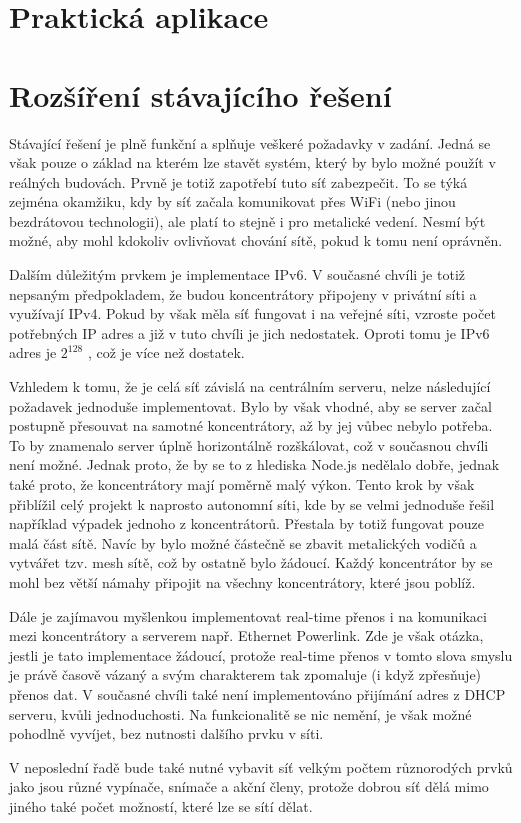 \chapter{Praktická aplikace}

\chapter{Rozšíření stávajícího řešení}
Stávající řešení je plně funkční a splňuje veškeré požadavky v zadání. Jedná se však pouze o základ na kterém lze stavět systém, který by bylo možné použít v reálných budovách. Prvně je totiž zapotřebí tuto síť zabezpečit. To se týká zejména okamžiku, kdy by síť začala komunikovat přes WiFi (nebo jinou bezdrátovou technologii), ale platí to stejně i pro metalické vedení. Nesmí být možné, aby mohl kdokoliv ovlivňovat chování sítě, pokud k tomu není oprávněn.

Dalším důležitým prvkem je implementace IPv6. V současné chvíli je totiž nepsaným předpokladem, že budou koncentrátory připojeny v privátní síti a využívají IPv4. Pokud by však měla síť fungovat i na veřejné síti, vzroste počet potřebných IP adres a již v tuto chvíli je jich nedostatek. Oproti tomu je IPv6 adres je $2^{128}$ \cite{ripe}, což je více než dostatek.

Vzhledem k tomu, že je celá síť závislá na centrálním serveru, nelze následující požadavek jednoduše implementovat. Bylo by však vhodné, aby se server začal postupně přesouvat na samotné koncentrátory, až by jej vůbec nebylo potřeba. To by znamenalo server úplně horizontálně rozškálovat, což v současnou chvíli není možné. Jednak proto, že by se to z hlediska Node.js nedělalo dobře, jednak také proto, že koncentrátory mají poměrně malý výkon. Tento krok by však přiblížil celý projekt k naprosto autonomní síti, kde by se velmi jednoduše řešil například výpadek jednoho z koncentrátorů. Přestala by totiž fungovat pouze malá část sítě. Navíc by bylo možné částečně se zbavit metalických vodičů a vytvářet tzv. mesh sítě, což by ostatně bylo žádoucí. Každý koncentrátor by se mohl bez větší námahy připojit na všechny koncentrátory, které jsou poblíž.

Dále je zajímavou myšlenkou implementovat real-time přenos i na komunikaci mezi koncentrátory a serverem např. Ethernet Powerlink. Zde je však otázka, jestli je tato implementace žádoucí, protože real-time přenos v tomto slova smyslu je právě časově vázaný a svým charakterem tak zpomaluje (i když zpřesňuje) přenos dat. V současné chvíli také není implementováno přijímání adres z DHCP serveru, kvůli jednoduchosti. Na funkcionalitě se nic nemění, je však možné pohodlně vyvíjet, bez nutnosti dalšího prvku v síti.

V neposlední řadě bude také nutné vybavit síť velkým počtem růz\-no\-ro\-dých prvků jako jsou různé vypínače, snímače a akční členy, protože dobrou síť dělá mimo jiného také počet možností, které lze se sítí dělat.